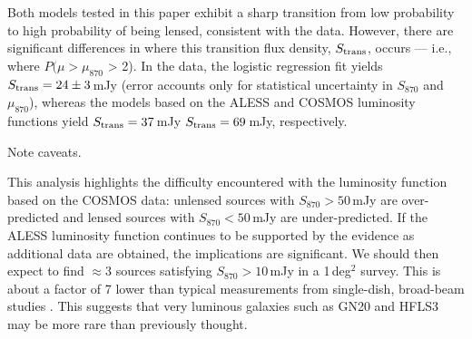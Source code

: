 \documentclass[iop]{emulateapj}
\begin{document}

Both models tested in this paper exhibit a sharp transition from low
probability to high probability of being lensed, consistent with the data.
However, there are significant differences in where this transition flux
density, $S_{\rm trans}$, occurs --- i.e., where $P(\mu>\mu_{870}$ > 2).  In
the data, the logistic regression fit yields $S_{\rm trans} = 24\pm3\,$mJy
(error accounts only for statistical uncertainty in $S_{870}$ and $\mu_{870}$),
whereas the models based on the ALESS and COSMOS luminosity functions yield
$S_{\rm trans} = 37\,$mJy $S_{\rm trans} = 69\,$mJy, respectively. 

Note caveats.

This analysis highlights the difficulty encountered with the luminosity
function based on the COSMOS data: unlensed sources with $S_{870} > 50\,$mJy
are over-predicted and lensed sources with $S_{870} < 50\,$mJy are
under-predicted.  If the ALESS luminosity function continues to be supported by
the evidence as additional data are obtained, the implications are significant.
We should then expect to find $\approx 3$ sources satisfying $S_{870} >
10\,$mJy in a 1$\,$deg$^2$ survey.  This is about a factor of 7 lower than
typical measurements from single-dish, broad-beam studies
\citep[e.g.,][]{Weis:2009ly}.  This suggests that very luminous galaxies such
as GN20 and HFLS3 may be more rare than previously thought.
\end{document}
